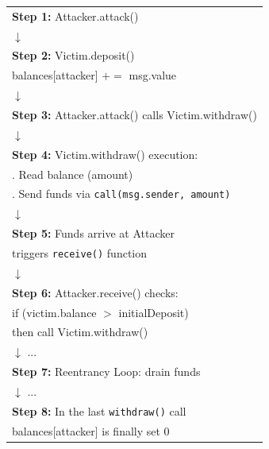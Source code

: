 \documentclass[12pt]{article}
\begin{document}
\begin{figure}[H]
\centering
\begin{minipage}{0.45\textwidth}
  \centering
  {\footnotesize
  \begin{tabular}{l}
  \textbf{Step 1:} Attacker.attack() \\
  $\downarrow$ \\
  \textbf{Step 2:} Victim.deposit() \\
  \quad balances[attacker] $\mathrel{+}= $ msg.value \\
  $\downarrow$ \\
  \textbf{Step 3:} Attacker.attack() calls Victim.withdraw() \\
  $\downarrow$ \\
  \textbf{Step 4:} Victim.withdraw() execution: \\
  \quad 1. Read balance (amount) \\
  \quad 2. Send funds via \texttt{call(msg.sender, amount)} \\
  $\downarrow$ \\
  \textbf{Step 5:} Funds arrive at Attacker \\
  \quad triggers \texttt{receive()} function \\
  $\downarrow$ \\
  \textbf{Step 6:} Attacker.receive() checks: \\
  \quad if (victim.balance $>$ initialDeposit) 
  \\ then call Victim.withdraw() \\
  $\downarrow$ ... \\
  \textbf{Step 7:} Reentrancy Loop: drain funds \\
  $\downarrow$ ... \\
  \textbf{Step 8:} In the last \texttt{withdraw()} call \\
  balances[attacker] is finally set 0 \\
  \end{tabular}
  }
\end{minipage}\hfill
\begin{minipage}{0.45\textwidth}
  \centering

\end{minipage}
\end{figure}
\end{document}
